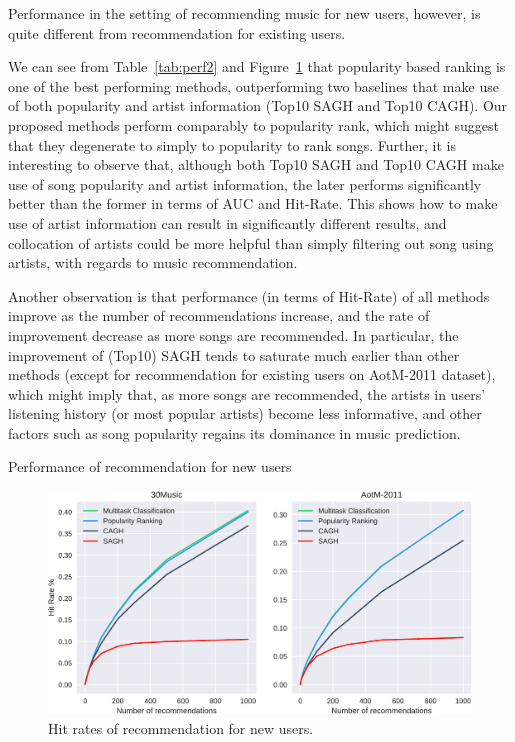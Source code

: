 Performance in the setting of recommending music for new users, however, is quite different from recommendation for existing users.

We can see from Table~\ref{tab:perf2} and Figure~\ref{fig:hr2} that popularity based ranking is one of the best performing methods,
outperforming two baselines that make use of both popularity and artist information (\ie Top10 SAGH and Top10 CAGH).
Our proposed methods perform comparably to popularity rank, which might suggest that they degenerate to simply to popularity to rank songs.
Further, it is interesting to observe that, although both Top10 SAGH and Top10 CAGH make use of song popularity and artist information,
the later performs significantly better than the former in terms of AUC and Hit-Rate.
This shows how to make use of artist information can result in significantly different results,
and collocation of artists could be more helpful than simply filtering out song using artists,
with regards to music recommendation.

Another observation is that performance (in terms of Hit-Rate) of all methods improve as the number of recommendations increase,
and the rate of improvement decrease as more songs are recommended.
In particular, the improvement of (Top10) SAGH tends to saturate much earlier than other methods 
(except for recommendation for existing users on AotM-2011 dataset),
which might imply that, as more songs are recommended, the artists in users' listening history
(or most popular artists) become less informative,
and other factors such as song popularity regains its dominance in music prediction.

\begin{table}[!h]
\centering
\caption{Performance of recommendation for new users}
\label{tab:perf2}
\resizebox{\columnwidth}{!}{

}
\end{table}


\begin{figure}[!h]
\centering
\includegraphics[width=\linewidth]{fig/hitrate2.pdf}
\caption{Hit rates of recommendation for new users.}
\label{fig:hr2}
\end{figure}
